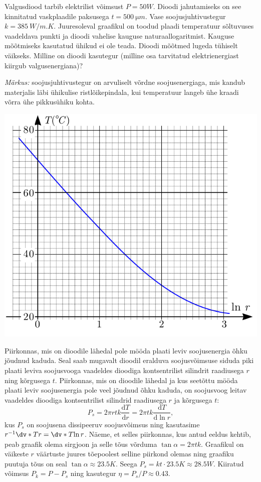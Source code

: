 
Valgusdiood tarbib elektrilist võimsust $P=\SI{50}W$. Dioodi jahutamiseks on see kinnitatud vaskplaadile paksusega $t=\SI{500}{\micro m}$. Vase soojusjuhtivustegur $k=\SI{385}{W/m.K}$. Juuresoleval graafikul on toodud plaadi temperatuur sõltuvuses vaadeldava punkti ja dioodi vahelise kauguse naturaallogaritmist. Kauguse mõõtmiseks kasutatud ühikud ei ole teada. Dioodi mõõtmed lugeda tühiselt väikseks. Milline on dioodi kasutegur (milline osa tarvitatud elektrienergiast kiirgub valgusenergiana)?

\textit{Märkus:} soojusjuhtivustegur on arvuliselt võrdne soojusenergiaga, mis kandub materjalis läbi ühikulise ristlõikepindala, kui temperatuur langeb ühe kraadi võrra ühe pikkusühiku kohta.
\begin{center}
	\includegraphics[width = 0.7\linewidth]{2018-lahg-09-yl.pdf}
\end{center}\hint
Piirkonnas, mis on dioodile lähedal pole mööda plaati leviv soojusenergia õhku jõudnud kaduda. Seal saab mugavalt dioodil eralduva soojusvõimsuse siduda piki plaati leviva soojusvooga vaadeldes dioodiga kontsentrilist silindrit raadiusega $r$ ning kõrgusega $t$.\solu
Piirkonnas, mis on dioodile lähedal ja kus seetõttu mööda plaati leviv soojusenergia pole veel jõudnud õhku kaduda, on soojusvoog leitav vaadeldes dioodiga kontsentrilist silindrid raadiusega $r$ ja kõrgusega $t$:
\[
P_s=2\pi rtk \frac{\mathrm d T}{\mathrm d r}=2\pi tk \frac{\mathrm d T}{\mathrm d \ln r},
\]
kus $P_s$ on soojusena dissipeeruv soojusvõimsus ning kasutasime $r^{-1}\dv*{T}{r} = \dv*{T}{\ln r}$. Näeme, et selles piirkonnas, kus antud eeldus kehtib, peab graafik olema sirgjoon ja selle tõus võrduma $\tan\alpha=2\pi tk$. Graafikul on väikeste $r$ väärtuste juures tõepoolest selline piirkond olemas ning graafiku puutuja tõus on seal $\tan\alpha\approx\SI{23.5}K$. Seega $P_s=kt\cdot \SI{23.5}K\approx \SI{28.5}W$. Kiiratud võimsus $P_k=P-P_s$ ning kasutegur $\eta=P_s/P\approx 0.43$.\probend
